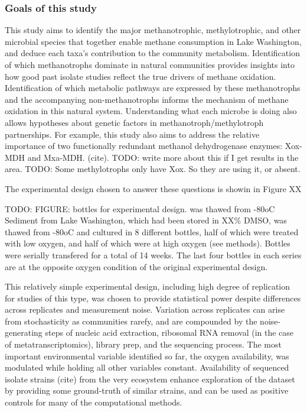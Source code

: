 \subsubsection{Goals of this study}
This study aims to identify the major methanotrophic, methylotrophic, and other microbial species that together enable methane consumption in Lake Washington, and deduce each taxa's contribution to the community metabolism.
Identification of which methanotrophs dominate in natural communities provides insights into how good past isolate studies reflect the true drivers of methane oxidation.
Identification of which metabolic pathways are expressed by these methanotrophs and the accompanying non-methanotrophs informs the mechanism of methane oxidation in this natural system.
Understanding what each microbe is doing also allows hypotheses about genetic factors in methanotroph/methylotroph partnerships.
For example, this study also aims to address the relative importance of two functionally redundant methanol dehydrogenase enzymes: Xox-MDH and Mxa-MDH. (cite).
TODO: write more about this if I get results in the area.
TODO: Some methylotrophs only have Xox.  So they are using it, or absent.

The experimental design chosen to answer these questions is showin in Figure XX

TODO: FIGURE: bottles for experimental design.   was thawed from -80oC
Sediment from Lake Washington, which had been stored in XX\% DMSO, was thawed from -80oC and cultured in 8 different bottles, half of which were treated with low oxygen, and half of which were at high oxygen (see methods).  Bottles were serially transfered for a total of 14 weeks.  The last four bottles in each series are at the opposite oxygen condition of the original experimental design.

This relatively simple experimental design, including high degree of replication for studies of this type, was chosen to provide statistical power despite differences across replicates and measurement noise.
Variation across replicates can arise from stochasticity as communities rarefy, and are compounded by the noise-generating steps of nucleic acid extraction, ribosomal RNA removal (in the case of metatranscriptomics), library prep, and the sequencing process.
The most important environmental variable identified so far, the oxygen availability, was modulated while holding all other variables constant.
Availability of sequenced isolate strains (cite) from the very ecosystem enhance exploration of the dataset by providing some ground-truth of similar strains, and can be used as positive controls for many of the computational methods.

